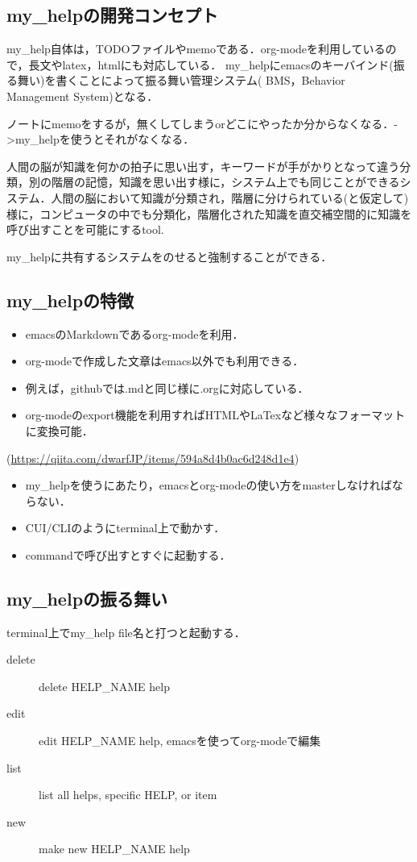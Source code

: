 \documentclass[a4j,twocolumn]{jsarticle}
\begin{document}
\subsection{my\_helpの開発コンセプト}
\label{sec-2-1}
my\_help自体は，TODOファイルやmemoである．org-modeを利用しているので，長文やlatex，htmlにも対応している．
my\_helpにemacsのキーバインド(振る舞い)を書くことによって振る舞い管理システム( BMS，Behavior Management System)となる．

ノートにmemoをするが，無くしてしまうorどこにやったか分からなくなる．->my\_helpを使うとそれがなくなる．

人間の脳が知識を何かの拍子に思い出す，キーワードが手がかりとなって違う分類，別の階層の記憶，知識を思い出す様に，システム上でも同じことができるシステム．人間の脳において知識が分類され，階層に分けられている(と仮定して)様に，コンピュータの中でも分類化，階層化された知識を直交補空間的に知識を呼び出すことを可能にするtool.

my\_helpに共有するシステムをのせると強制することができる．


\subsection{my\_helpの特徴}
\label{sec-2-2}
\begin{itemize}
\item emacsのMarkdownであるorg-modeを利用．
\item org-modeで作成した文章はemacs以外でも利用できる．
\item 例えば，githubでは.mdと同じ様に.orgに対応している．
\item org-modeのexport機能を利用すればHTMLやLaTexなど様々なフォーマットに変換可能．
\end{itemize}
(\url{https://qiita.com/dwarfJP/items/594a8d4b0ac6d248d1e4})
\begin{itemize}
\item my\_helpを使うにあたり，emacsとorg-modeの使い方をmasterしなければならない．
\item CUI/CLIのようにterminal上で動かす．
\item commandで呼び出すとすぐに起動する．
\end{itemize}

\subsection{my\_helpの振る舞い}
\label{sec-2-3}
terminal上でmy\_help file名と打つと起動する．
\begin{description}
\item[{delete}] delete HELP\_NAME help
\item[{edit}] edit HELP\_NAME help, emacsを使ってorg-modeで編集
\item[{list}] list all helps, specific HELP, or item
\item[{new}] make new HELP\_NAME help
\end{description}
\end{document}

